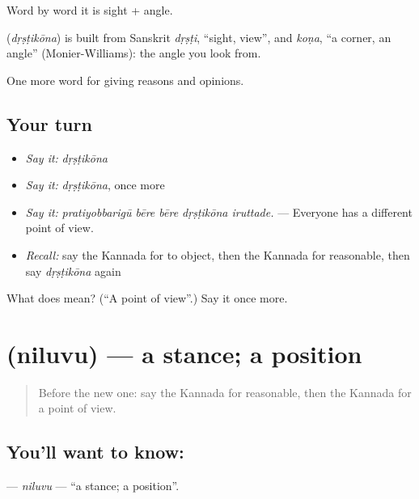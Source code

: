 Word by word it is sight + angle.

\begin{cousinweb}
\textbf{} (\emph{dṛṣṭikōna}) is built from Sanskrit \emph{dṛṣṭi}, \textquotedblleft{}sight, view\textquotedblright{}, and \emph{koṇa}, \textquotedblleft{}a corner, an angle\textquotedblright{} (Monier-Williams): the angle you look from.
\end{cousinweb}

\begin{grammarlens}[title={What you've built}]
One more word for giving reasons and opinions.
\end{grammarlens}

\subsection*{Your turn}
\begin{itemize}
\raggedright
  \item \emph{Say it:} \emph{dṛṣṭikōna}
  \item \emph{Say it:} \emph{dṛṣṭikōna}, once more
  \item \emph{Say it:} \emph{pratiyobbarigū bēre bēre dṛṣṭikōna iruttade.} — Everyone has a different point of view.
  \item \emph{Recall:} say the Kannada for to object, then the Kannada for reasonable, then say \emph{dṛṣṭikōna} again
\end{itemize}

\begin{tcolorbox}[breakable,colback=teal!4,colframe=teal!35!black,title={Before you move on}]
What does  mean? (\textquotedblleft{}A point of view\textquotedblright{}.) Say it once more.
\end{tcolorbox}
\section[\texorpdfstring{\kn{ನಿಲುವು} (niluvu)}{ನಿಲುವು (niluvu)}]{ (niluvu) — a stance; a position}

\label{lesson:KA-C378-niluvu}



\begin{quote}
Before the new one: say the Kannada for reasonable, then the Kannada for a point of view.
\end{quote}

\subsection*{You'll want to know: }
\textbf{} — \emph{niluvu} — \textquotedblleft{}a stance; a position\textquotedblright{}.

